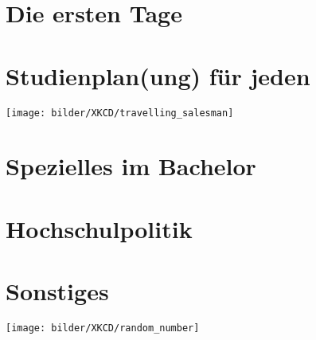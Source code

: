\documentclass[]{papertex}
\begin{document}
	\thispagestyle{empty}
	\clearpage
	\setcounter{page}{1}
	\tableofcontents
	
	\newpage
	\section{Die ersten Tage}
		
	\newpage
	\section{Studienplan(ung) für jeden}
		\label{studienplan}
		\begin{multicols}{2}
		
		\end{multicols}
		\vfill
		\begin{center}
		\texttt{[image: bilder/XKCD/travelling\_salesman]}
	      \end{center}
	      \vfill
	\newpage
	\section{Spezielles im Bachelor}
		\label{bachelor}
		
		
		
	
	\newpage
	\section{Hochschulpolitik}
		\label{politik}
		\begin{multicols}{2}
		
		
		\end{multicols}
	\newpage
	\section{Sonstiges}
		\label{sonstiges}
		\begin{center}
		\texttt{[image: bilder/XKCD/random\_number]}
		\end{center}
		\begin{multicols}{2}
		
		
		\end{multicols}
		\newpage
		
		\newpage
		
\end{document}
